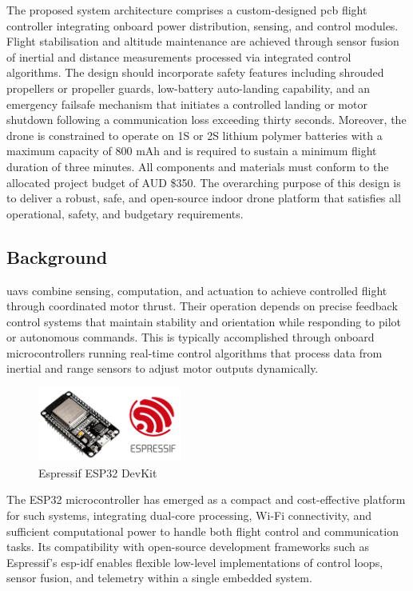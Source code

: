 The proposed system architecture comprises a custom-designed \gls{pcb} flight controller integrating onboard power distribution, sensing, and control modules. Flight stabilisation and altitude maintenance are achieved through sensor fusion of inertial and distance measurements processed via integrated control algorithms. The design should incorporate safety features including shrouded propellers or propeller guards, low-battery auto-landing capability, and an emergency failsafe mechanism that initiates a controlled landing or motor shutdown following a communication loss exceeding thirty seconds. Moreover, the drone is constrained to operate on 1S or 2S lithium polymer batteries with a maximum capacity of 800 mAh and is required to sustain a minimum flight duration of three minutes. All components and materials must conform to the allocated project budget of AUD \$350. The overarching purpose of this design is to deliver a robust, safe, and open-source indoor drone platform that satisfies all operational, safety, and budgetary requirements. 

\subsection{Background}
\glspl{uav} combine sensing, computation, and actuation to achieve controlled flight through coordinated motor thrust. Their operation depends on precise feedback control systems that maintain stability and orientation while responding to pilot or autonomous commands. This is typically accomplished through onboard microcontrollers running real-time control algorithms that process data from inertial and range sensors to adjust motor outputs dynamically.

\begin{figure}[H]
    \centering
    \captionsetup{justification=centering, margin=1cm}
    \includegraphics[width=0.42\textwidth]{img/intro-espressif.PNG}
    \caption{Espressif ESP32 DevKit~\cite{iotdesignpro2019}}
\end{figure}

The ESP32 microcontroller has emerged as a compact and cost-effective platform for such systems, integrating dual-core processing, Wi-Fi connectivity, and sufficient computational power to handle both flight control and communication tasks. Its compatibility with open-source development frameworks such as Espressif’s \gls{esp-idf} enables flexible low-level implementations of control loops, sensor fusion, and telemetry within a single embedded system.

